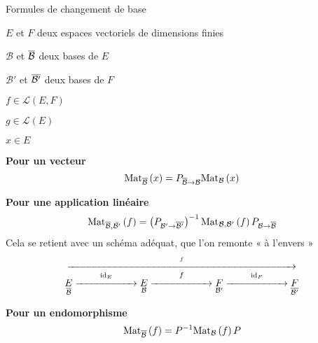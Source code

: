     \begin{theo}{Formules de changement de base}{}
        \begin{soient}
            \item $E$ et $F$ deux espaces vectoriels de dimensions finies
            \item $\mathcal{B}$ et $\overline{\mathcal{B}}$ deux bases de $E$
            \item $\mathcal{B}'$ et $\overline{\mathcal{B}'}$ deux bases de $F$
            \item $f \in \mathcal{L}(E,F)$
            \item $g \in \mathcal{L}(E)$
            \item $x \in E$
        \end{soient}
        \begin{alors}
            \item \textbf{Pour un vecteur}
            \[ \text{Mat}_{\overline{\mathcal{B}}}\left(x\right) = P_{\overline{\mathcal{B}} \rightarrow \mathcal{B}}\text{Mat}_{\mathcal{B}}\left(x\right) \]
            \item \textbf{Pour une application linéaire} 
            \[ \text{Mat}_{\overline{\mathcal{B}}, \bar{\mathcal{B}'}}\left(f\right) = \left(P_{\mathcal{B}' \rightarrow \overline{\mathcal{B}'}}\right)^{-1} \text{Mat}_{\mathcal{B},\mathcal{B}'}\left(f\right) P_{\mathcal{B} \rightarrow \overline{\mathcal{B}}} \]
            Cela se retient avec un schéma adéquat, que l’on remonte « à l’envers »
            \[ \overset{\overset{f}{\xrightarrow{\hspace*{8cm}}}}{\underset{\ovl{\mathcal{B}}}{E} \overset{\id_E}{\xrightarrow{\hspace*{2cm}}} \underset{\mathcal{B}}{E} \overset{f}{\xrightarrow{\hspace*{2cm}}} \underset{\mathcal{B}'}{F} \overset{\id_F}{\xrightarrow{\hspace*{2cm}}} \underset{\ovl{\mathcal{B}'}}{F}} \]  
            \item \textbf{Pour un endomorphisme} 
            \[ \text{Mat}_{\overline{\mathcal{B}}}\left(f\right) = P^{-1} \text{Mat}_{\mathcal{B}}\left(f\right) P \]
        \end{alors}
    \end{theo}

